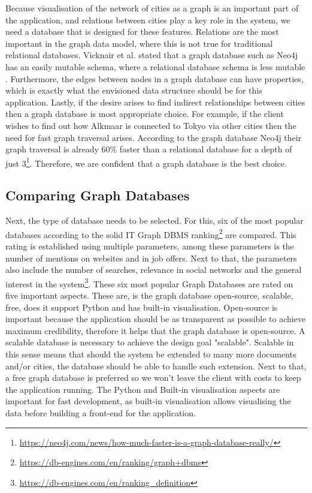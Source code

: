 Because visualisation of the network of cities as a graph is an important part of the application, and relations between cities play a key role in the system, we need a database that is designed for these features. Relations are the most important in the graph data model, where this is not true for traditional relational databases. Vicknair et al. stated that a graph database such as Neo4j has an easily mutable schema, where a relational database schema is less mutable \cite{vicknair2010}. Furthermore, the edges between nodes in a graph database can have properties, which is exactly what the envisioned data structure should be for this application. Lastly, if the desire arises to find indirect relationships between cities then a graph database is most appropriate choice. For example, if the client wishes to find out how Alkmaar is connected to Tokyo via other cities then the need for fast graph traversal arises. According to the graph database Neo4j their graph traversal is already 60\% faster than a relational database for a depth of just 3\footnote{\url{https://neo4j.com/news/how-much-faster-is-a-graph-database-really/}}.  Therefore, we are confident that a graph database is the best choice.

\subsection{Comparing Graph Databases}
Next, the type of database needs to be selected. For this, six of the most popular databases according to the solid IT Graph DBMS ranking\footnote{\url{https://db-engines.com/en/ranking/graph+dbms}\label{ranking}} are compared. This rating is established using multiple parameters, among these parameters is the number of mentions on websites and in job offers. Next to that, the parameters also include the number of searches, relevance in social networks and the general interest in the system\footnote{\url{https://db-engines.com/en/ranking_definition}}. These six most popular Graph Databases are rated on five important aspects. These are, is the graph database open-source, scalable, free, does it support Python and has built-in visualisation. Open-source is important because the application should be as transparent as possible to achieve maximum credibility, therefore it helps that the graph database is open-source. A scalable database is necessary to achieve the design goal "scalable". Scalable in this sense means that should the system be extended to many more documents and/or cities, the database should be able to handle such extension. Next to that, a free graph database is preferred so we won't leave the client with costs to keep the application running. The Python and Built-in visualisation aspects are important for fast development, as built-in visualisation allows visualising the data before building a front-end for the application.


